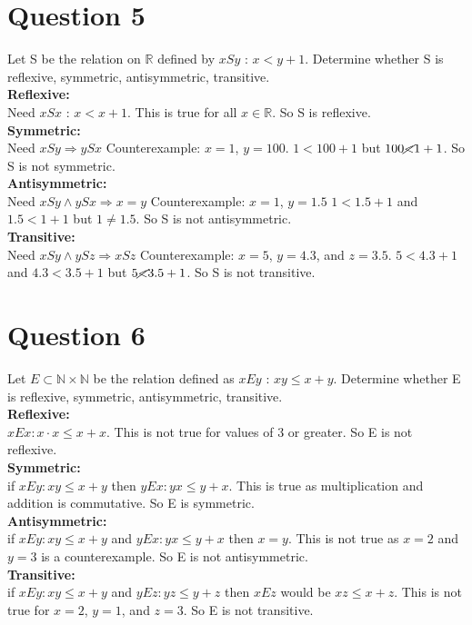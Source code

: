\documentclass{article}
\begin{document}
\section*{Question 5}
Let S be the relation on $\mathbb{R}$ defined by $xSy$ : $ x<y+1$. Determine whether S is reflexive, symmetric, antisymmetric, transitive. \\
\textbf{Reflexive:}\\
Need $xSx$ : $x < x+1$. This is true for all $x \in \mathbb{R}$. So S is reflexive.\\
\textbf{Symmetric:}\\
Need $xSy \Rightarrow ySx$ Counterexample: $x=1$, $y=100$. $1 < 100+1$ but $100 \cancel{<} 1+1$. So S is not symmetric.\\
\textbf{Antisymmetric:}\\
Need $xSy \land ySx \Rightarrow x = y$ Counterexample: $x=1$, $y=1.5$ $1 < 1.5+1$ and $1.5 < 1+1$ but $1 \neq 1.5$. So S is not antisymmetric.\\
\textbf{Transitive:}\\
Need $xSy \land ySz \Rightarrow xSz$ Counterexample: $x=5$, $y=4.3$, and $z=3.5$. $5 < 4.3+1$ and $4.3 < 3.5+1$ but $5 \cancel{<} 3.5+1$. So S is not transitive.\\
\section*{Question 6}
Let $E \subset \mathbb{N} \times \mathbb{N}$ be the relation defined as $xEy$ : $xy \leq x+y$. Determine whether E is reflexive, symmetric, antisymmetric, transitive.\\
\textbf{Reflexive:}\\
$xEx : x \cdot x \leq x + x$. This is not true for values of 3 or greater. So E is not reflexive.\\
\textbf{Symmetric:}\\
if $xEy : xy \leq x+y$ then $yEx : yx \leq y+x$. This is true as multiplication and addition is commutative. So E is symmetric.\\
\textbf{Antisymmetric:}\\
if $xEy : xy \leq x+y$ and $yEx : yx \leq y+x$ then $x=y$. This is not true as $x=2$ and $y=3$ is a counterexample. So E is not antisymmetric.\\
\textbf{Transitive:}\\
if $xEy : xy \leq x+y$ and $yEz : yz \leq y+z$ then $xEz$ would be $xz \leq x+z$. This is not true for $x=2$, $y=1$, and $z=3$. So E is not transitive.\\
\end{document}
